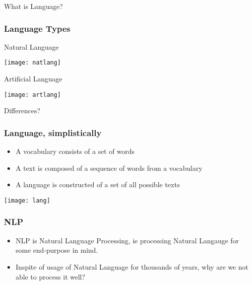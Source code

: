 \begin{frame}
  \begin{center}
    {\Large What is Language?}
  \end{center}
\end{frame}

\begin{frame}[fragile]\frametitle{Language Types}
Natural Language
\begin{center}
\texttt{[image: natlang]}
\end{center}
Artificial Language
\begin{center}
\texttt{[image: artlang]}
\end{center}
Differences?
\end{frame}

\begin{frame}[fragile]\frametitle{Language, simplistically}

	\begin{itemize}
	\item A vocabulary consists of a set of words
	\item A text is composed of a  sequence of words from  a vocabulary
	\item A language is constructed of a  set of all possible texts
	\end{itemize}

\begin{center}
\texttt{[image: lang]}
\end{center}

\end{frame}

\begin{frame}[fragile]\frametitle{NLP}

	\begin{itemize}
	\item NLP is Natural Language Processing, ie processing Natural Langauge for some end-purpose in mind.
	\item Inspite of usage of Natural Language for thousands of years, why are we not able to process it well?
	\end{itemize}	

\end{frame}

